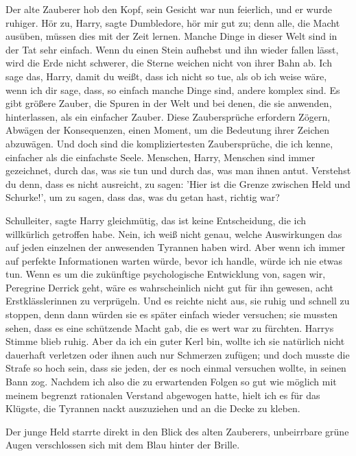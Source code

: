 Der alte Zauberer hob den Kopf, sein Gesicht war nun feierlich, und er wurde
ruhiger. \glqq{}Hör zu, Harry\grqq{}, sagte Dumbledore, \glqq{}hör mir gut zu;
denn alle, die Macht ausüben, müssen dies mit der Zeit lernen. Manche Dinge in
dieser Welt sind in der Tat sehr einfach. Wenn du einen Stein aufhebst und ihn
wieder fallen lässt, wird die Erde nicht schwerer, die Sterne weichen nicht von
ihrer Bahn ab. Ich sage das, Harry, damit du weißt, dass ich nicht so tue, als
ob ich weise wäre, wenn ich dir sage, dass, so einfach manche Dinge sind, andere
komplex sind. Es gibt größere Zauber, die Spuren in der Welt und bei denen, die
sie anwenden, hinterlassen, als ein einfacher Zauber. Diese Zaubersprüche
erfordern Zögern, Abwägen der Konsequenzen, einen Moment, um die Bedeutung ihrer
Zeichen abzuwägen. Und doch sind die kompliziertesten Zaubersprüche, die ich
kenne, einfacher als die einfachste Seele. Menschen, Harry, Menschen sind immer
gezeichnet, durch das, was sie tun und durch das, was man ihnen antut. Verstehst
du denn, dass es nicht ausreicht, zu sagen: 'Hier ist die Grenze zwischen Held
und Schurke!', um zu sagen, dass das, was du getan hast, richtig war?\grqq{}

\glqq{}Schulleiter\grqq{}, sagte Harry gleichmütig, \glqq{}das ist keine
Entscheidung, die ich willkürlich getroffen habe. Nein, ich weiß nicht genau,
welche Auswirkungen das auf jeden einzelnen der anwesenden Tyrannen haben wird.
Aber wenn ich immer auf perfekte Informationen warten würde, bevor ich handle,
würde ich nie etwas tun. Wenn es um die zukünftige psychologische Entwicklung
von, sagen wir, Peregrine Derrick geht, wäre es wahrscheinlich nicht gut für ihn
gewesen, acht Erstklässlerinnen zu verprügeln. Und es reichte nicht aus, sie
ruhig und schnell zu stoppen, denn dann würden sie es später einfach wieder
versuchen; sie mussten sehen, dass es eine schützende Macht gab, die es wert war
zu fürchten.\grqq{} Harrys Stimme blieb ruhig. \glqq{}Aber da ich ein guter Kerl
bin, wollte ich sie natürlich nicht dauerhaft verletzen oder ihnen auch nur
Schmerzen zufügen; und doch musste die Strafe so hoch sein, dass sie jeden, der
es noch einmal versuchen wollte, in seinen Bann zog. Nachdem ich also die zu
erwartenden Folgen so gut wie möglich mit meinem begrenzt rationalen Verstand
abgewogen hatte, hielt ich es für das Klügste, die Tyrannen nackt auszuziehen
und an die Decke zu kleben.\grqq{}

Der junge Held starrte direkt in den Blick des alten Zauberers, unbeirrbare
grüne Augen verschlossen sich mit dem Blau hinter der Brille.

